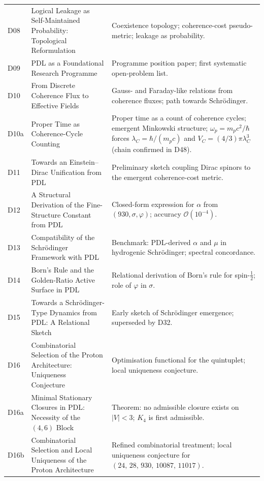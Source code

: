 \documentclass[11pt,a4paper]{article}
\theoremstyle{plain}
\theoremstyle{definition}
\theoremstyle{remark}
\newcommand{\quintuplet}{(24,\,28,\,930,\,10087,\,11017)}
\begin{document}
\begin{longtable}{L{1.3cm}L{3.8cm}L{8.0cm}}
D08 & Logical Leakage as Self-Maintained Probability: Topological Reformulation~\cite{D08} & Coexistence topology; coherence-cost pseudo-metric; leakage as probability.\\[0.3em]
D09 & PDL as a Foundational Research Programme~\cite{D09} & Programme position paper; first systematic open-problem list.\\[0.3em]
D10 & From Discrete Coherence Flux to Effective Fields~\cite{D10} & Gauss- and Faraday-like relations from coherence fluxes; path towards Schr\"odinger.\\[0.3em]
D10a & Proper Time as Coherence-Cycle Counting~\cite{D10a} & Proper time as a count of coherence cycles; emergent Minkowski structure; $\omega_p = m_p c^2/\hbar$ forces $\lambda_C = \hbar/(m_p c)$ and $V_C = (4/3)\pi\lambda_C^3$ (chain confirmed in D48).\\[0.3em]
D11 & Towards an Einstein--Dirac Unification from PDL~\cite{D11} & Preliminary sketch coupling Dirac spinors to the emergent coherence-cost metric.\\[0.3em]
D12 & A Structural Derivation of the Fine-Structure Constant from PDL~\cite{D12} & Closed-form expression for $\alpha$ from $(930, \sigma, \varphi)$; accuracy $\mathcal{O}(10^{-4})$.\\[0.3em]
D13 & Compatibility of the Schr\"odinger Framework with PDL~\cite{D13} & Benchmark: PDL-derived $\alpha$ and $\mu$ in hydrogenic Schr\"odinger; spectral concordance.\\[0.3em]
D14 & Born's Rule and the Golden-Ratio Active Surface in PDL~\cite{D14} & Relational derivation of Born's rule for spin-$\tfrac{1}{2}$; role of $\varphi$ in $\sigma$.\\[0.3em]
D15 & Towards a Schr\"odinger-Type Dynamics from PDL: A Relational Sketch~\cite{D15} & Early sketch of Schr\"odinger emergence; superseded by D32.\\[0.3em]
D16 & Combinatorial Selection of the Proton Architecture: Uniqueness Conjecture~\cite{D16} & Optimisation functional for the quintuplet; local uniqueness conjecture.\\[0.3em]
D16a & Minimal Stationary Closures in PDL: Necessity of the $(4,6)$ Block~\cite{D16a} & \textcolor{proofblue}{Theorem}: no admissible closure exists on $|V|<3$; $K_4$ is first admissible.\\[0.3em]
D16b & Combinatorial Selection and Local Uniqueness of the Proton Architecture~\cite{D16b} & Refined combinatorial treatment; local uniqueness conjecture for $\quintuplet$.\\[0.3em]

\end{longtable}
\end{document}
